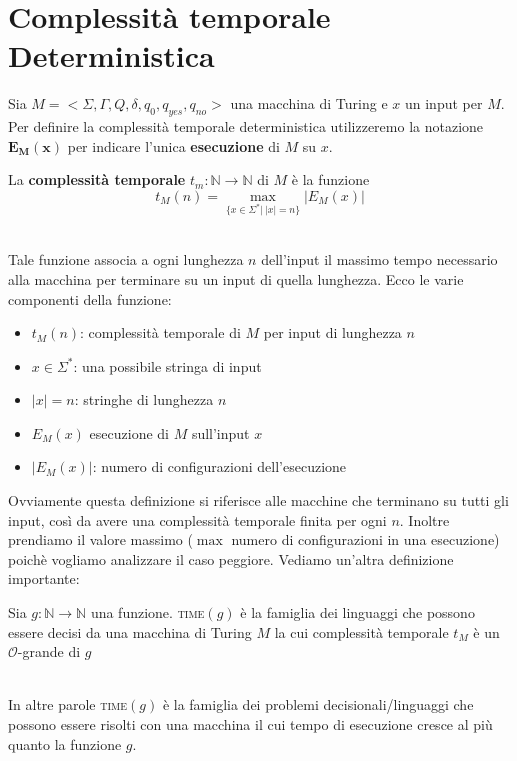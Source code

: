 \section{Complessità temporale Deterministica}
Sia $M = < \Sigma , \Gamma, Q, \delta, q_0,q_{yes}, q_{no}>$ una macchina di Turing e $x$ un input per $M$.
Per definire la complessità temporale deterministica utilizzeremo la notazione $\bm{E_M(x)}$ per indicare l'unica \textbf{esecuzione} di $M$ su $x$.\smallskip\\
\colorbox{SALZO}{\parbox{\dimexpr\linewidth-2\fboxsep}{\begin{definition}
   La \textbf{complessità temporale} $t_m: \mathbb{N}\to \mathbb{N}$ di $M$ è la funzione
   \[  t_M (n) = \max_{\{x \in \Sigma^* | \ |x| = n\}} |E_M(x)|   \]
\end{definition}}}\smallskip\\
Tale funzione associa a ogni lunghezza $n$ dell'input il massimo tempo necessario alla macchina per terminare su un input di quella lunghezza.
Ecco le varie componenti della funzione:
\begin{itemize}
    \item $t_M(n)$: complessità temporale di $M$ per input di lunghezza $n$
    \item $x \in \Sigma^*$: una possibile stringa di input
    \item $|x| = n$: stringhe di lunghezza $n$
    \item $E_M(x)$ esecuzione di $M$ sull'input $x$
    \item $|E_M(x)|$: numero di configurazioni dell'esecuzione
\end{itemize}
Ovviamente questa definizione si riferisce alle macchine che terminano su tutti gli input, così da avere una complessità temporale finita per ogni $n$. 
Inoltre prendiamo il valore massimo ($\max$ numero di configurazioni in una esecuzione) poichè vogliamo analizzare il caso peggiore. Vediamo un'altra definizione importante:\smallskip\\
\colorbox{SALZO}{\parbox{\dimexpr\linewidth-2\fboxsep}{\begin{definition}
   Sia $g: \mathbb{N}\to \mathbb{N}$ una funzione. \textsc{time}$(g)$ è la famiglia dei linguaggi che possono essere decisi da una macchina di Turing $M$ la cui complessità temporale $t_M$ è un $\mathcal{O}$-grande di $g$
\end{definition}}}\smallskip\\
In altre parole \textsc{time}$(g)$ è la famiglia dei problemi decisionali/linguaggi che possono essere risolti con una macchina il cui tempo di esecuzione cresce al più quanto la funzione $g$.
